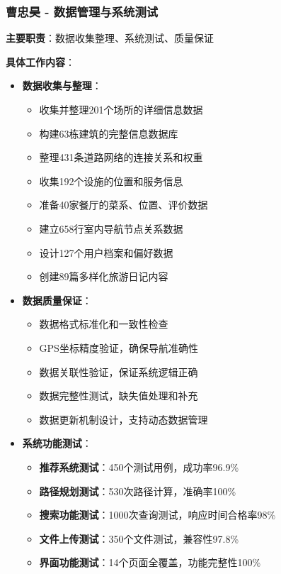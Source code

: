 \documentclass[12pt,a4paper]{article}
\begin{document}
\subsubsection{曹忠昊 - 数据管理与系统测试}
\textbf{主要职责}：数据收集整理、系统测试、质量保证

\textbf{具体工作内容}：
\begin{itemize}
    \item \textbf{数据收集与整理}：
    \begin{itemize}
        \item 收集并整理201个场所的详细信息数据
        \item 构建63栋建筑的完整信息数据库
        \item 整理431条道路网络的连接关系和权重
        \item 收集192个设施的位置和服务信息
        \item 准备40家餐厅的菜系、位置、评价数据
        \item 建立658行室内导航节点关系数据
        \item 设计127个用户档案和偏好数据
        \item 创建89篇多样化旅游日记内容
    \end{itemize}
    
    \item \textbf{数据质量保证}：
    \begin{itemize}
        \item 数据格式标准化和一致性检查
        \item GPS坐标精度验证，确保导航准确性
        \item 数据关联性验证，保证系统逻辑正确
        \item 数据完整性测试，缺失值处理和补充
        \item 数据更新机制设计，支持动态数据管理
    \end{itemize}
    
    \item \textbf{系统功能测试}：
    \begin{itemize}
        \item \textbf{推荐系统测试}：450个测试用例，成功率96.9\%
        \item \textbf{路径规划测试}：530次路径计算，准确率100\%
        \item \textbf{搜索功能测试}：1000次查询测试，响应时间合格率98\%
        \item \textbf{文件上传测试}：350个文件测试，兼容性97.8\%
        \item \textbf{界面功能测试}：14个页面全覆盖，功能完整性100\%
    \end{itemize}
    

\end{itemize}
\end{document}
